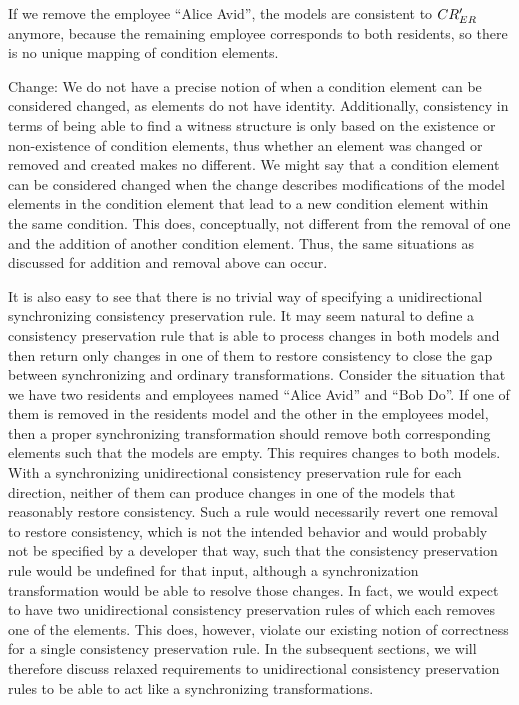 \begin{properdescription}
    If we remove the employee \enquote{Alice Avid}, the models are consistent to $CR_{ER}'$ anymore, because the remaining employee corresponds to both residents, so there is no unique mapping of condition elements.
    \item[Change:] We do not have a precise notion of when a condition element can be considered changed, as elements do not have identity. 
    Additionally, consistency in terms of being able to find a witness structure is only based on the existence or non-existence of condition elements, thus whether an element was changed or removed and created makes no different.
    We might say that a condition element can be considered changed when the change describes modifications of the model elements in the condition element that lead to a new condition element within the same condition.
    This does, conceptually, not different from the removal of one and the addition of another condition element.
    Thus, the same situations as discussed for addition and removal above can occur.
\end{properdescription}

It is also easy to see that there is no trivial way of specifying a unidirectional synchronizing consistency preservation rule.
It may seem natural to define a consistency preservation rule that is able to process changes in both models and then return only changes in one of them to restore consistency to close the gap between synchronizing and ordinary transformations.
Consider the situation that we have two residents and employees named \enquote{Alice Avid} and \enquote{Bob Do}.
If one of them is removed in the residents model and the other in the employees model, then a proper synchronizing transformation should remove both corresponding elements such that the models are empty.
This requires changes to both models.
With a synchronizing unidirectional consistency preservation rule for each direction, neither of them can produce changes in one of the models that reasonably restore consistency.
Such a rule would necessarily revert one removal to restore consistency, which is not the intended behavior and would probably not be specified by a developer that way, such that the consistency preservation rule would be undefined for that input, although a synchronization transformation would be able to resolve those changes.
In fact, we would expect to have two unidirectional consistency preservation rules of which each removes one of the elements.
This does, however, violate our existing notion of correctness for a single consistency preservation rule.
In the subsequent sections, we will therefore discuss relaxed requirements to unidirectional consistency preservation rules to be able to act like a synchronizing transformations.

